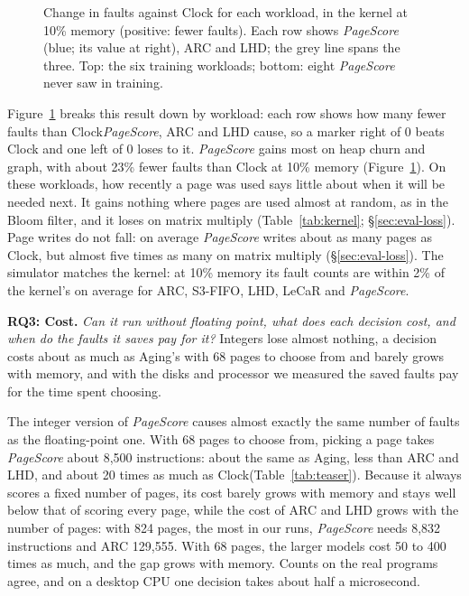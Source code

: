 \documentclass{article}
\newcommand{\clock}{Clock\xspace}
\DeclareRobustCommand{\pagescore}{\textit{PageScore}}
\newcommand{\rqbox}[3]{\par\smallskip\noindent\textbf{#1.} \emph{#2} #3\par}
\begin{document}
\begin{figure}[t]
\caption{Change in faults against \clock for each workload, in the kernel at 10\% memory (positive: fewer faults). Each row shows \pagescore{} (blue; its value at right), ARC and LHD; the grey line spans the three. Top: the six training workloads; bottom: eight \pagescore{} never saw in training.}
\label{fig:gains}
\end{figure}

Figure~\ref{fig:gains} breaks this result down by workload: each row shows how many fewer faults than \clock \pagescore{}, ARC and LHD cause, so a marker right of 0 beats \clock and one left of 0 loses to it. \pagescore{} gains most on heap churn and graph, with about 23\% fewer faults than \clock at 10\% memory (Figure~\ref{fig:gains}). On these workloads, how recently a page was used says little about when it will be needed next. It gains nothing where pages are used almost at random, as in the Bloom filter, and it loses on matrix multiply (Table~\ref{tab:kernel}; \S\ref{sec:eval-loss}). Page writes do not fall: on average \pagescore{} writes about as many pages as \clock, but almost five times as many on matrix multiply (\S\ref{sec:eval-loss}). The simulator matches the kernel: at 10\% memory its fault counts are within 2\% of the kernel's on average for ARC, S3-FIFO, LHD, LeCaR and \pagescore{}.

\rqbox{RQ3: Cost}{Can it run without floating point, what does each decision cost, and when do the faults it saves pay for it?}{Integers lose almost nothing, a decision costs about as much as Aging's with 68 pages to choose from and barely grows with memory, and with the disks and processor we measured the saved faults pay for the time spent choosing.}\label{sec:eval-cost}

The integer version of \pagescore{} causes almost exactly the same number of faults as the floating-point one. With 68 pages to choose from, picking a page takes \pagescore{} about 8,500 instructions: about the same as Aging, less than ARC and LHD, and about 20 times as much as \clock (Table~\ref{tab:teaser}). Because it always scores a fixed number of pages, its cost barely grows with memory and stays well below that of scoring every page, while the cost of ARC and LHD grows with the number of pages: with 824 pages, the most in our runs, \pagescore{} needs 8,832 instructions and ARC 129,555. With 68 pages, the larger models cost 50 to 400 times as much, and the gap grows with memory. Counts on the real programs agree, and on a desktop CPU one decision takes about half a microsecond.
\end{document}

